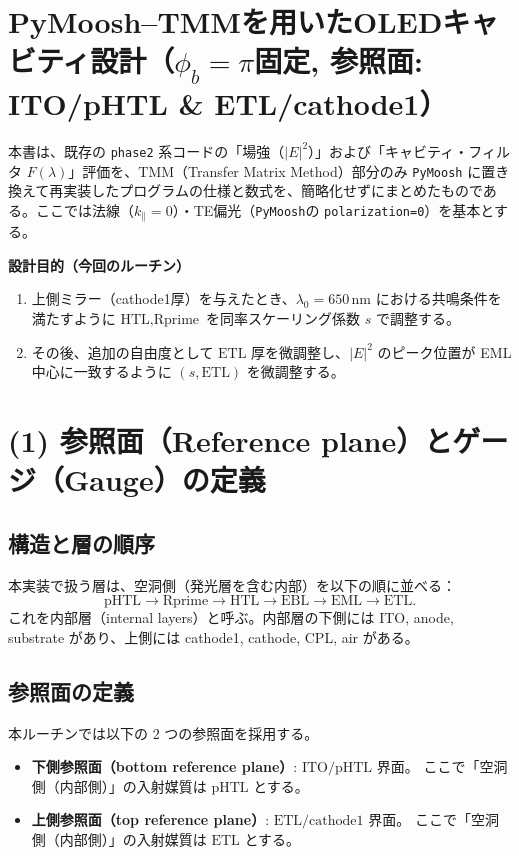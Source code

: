 

\section*{PyMoosh--TMMを用いたOLEDキャビティ設計（\texorpdfstring{$\phi_b=\pi$}{phi\_b=pi}固定, 参照面: ITO/pHTL \& ETL/cathode1）}

本書は、既存の \texttt{phase2} 系コードの「場強（\(|E|^2\)）」および「キャビティ・フィルタ \(F(\lambda)\)」評価を、TMM（Transfer Matrix Method）部分のみ \texttt{PyMoosh} に置き換えて再実装したプログラムの仕様と数式を、簡略化せずにまとめたものである。ここでは法線（\(k_\parallel=0\)）・TE偏光（\texttt{PyMoosh}の \texttt{polarization=0}）を基本とする。

\vspace{0.8em}
\noindent
\textbf{設計目的（今回のルーチン）}
\begin{enumerate}
\item 上側ミラー（cathode1厚）を与えたとき、\(\lambda_0=650\,\mathrm{nm}\) における共鳴条件を満たすように \(\text{HTL},\text{Rprime}\) を同率スケーリング係数 \(s\) で調整する。
\item その後、追加の自由度として \(\text{ETL}\) 厚を微調整し、\(|E|^2\) のピーク位置が EML中心に一致するように \((s,\text{ETL})\) を微調整する。
\end{enumerate}

\section{(1) 参照面（Reference plane）とゲージ（Gauge）の定義}

\subsection{構造と層の順序}
本実装で扱う層は、空洞側（発光層を含む内部）を以下の順に並べる：
\[
\text{pHTL} \rightarrow \text{Rprime} \rightarrow \text{HTL} \rightarrow \text{EBL} \rightarrow \text{EML} \rightarrow \text{ETL}.
\]
これを内部層（internal layers）と呼ぶ。内部層の下側には ITO, anode, substrate があり、上側には cathode1, cathode, CPL, air がある。

\subsection{参照面の定義}
本ルーチンでは以下の 2 つの参照面を採用する。

\begin{itemize}
\item \textbf{下側参照面（bottom reference plane）}: \(\text{ITO}/\text{pHTL}\) 界面。
  ここで「空洞側（内部側）」の入射媒質は \(\text{pHTL}\) とする。
\item \textbf{上側参照面（top reference plane）}: \(\text{ETL}/\text{cathode1}\) 界面。
  ここで「空洞側（内部側）」の入射媒質は \(\text{ETL}\) とする。
\end{itemize}


